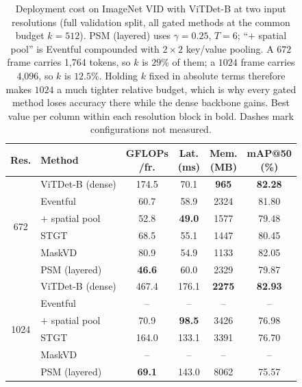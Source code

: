 \begin{table}[t]
\centering
\footnotesize
\setlength{\tabcolsep}{3pt}
\begin{tabular}{clcccc}
\toprule
Res. & Method & \makecell{GFLOPs\\/fr.} & \makecell{Lat.\\(ms)} & \makecell{Mem.\\(MB)} & \makecell{mAP@50\\(\%)} \\
\midrule
\multirow{6}{*}{672}
 & ViTDet-B (dense)     & 174.5 & 70.1 & \textbf{965}  & \textbf{82.28} \\
 & Eventful             & 60.7  & 58.9 & 2324 & 81.80 \\
 & \;\;$+$ spatial pool & 52.8  & \textbf{49.0} & 1577 & 79.48 \\
 & STGT                 & 68.5  & 55.1 & 1447 & 80.45 \\
 & MaskVD               & 80.9  & 54.9 & 1133 & 82.05 \\
 & PSM (layered)        & \textbf{46.6} & 60.0 & 2329 & 79.87 \\
\midrule
\multirow{6}{*}{1024}
 & ViTDet-B (dense)     & 467.4 & 176.1 & \textbf{2275} & \textbf{82.93} \\
 & Eventful             & --    & --    & --   & --    \\
 & \;\;$+$ spatial pool & 70.9  & \textbf{98.5} & 3426 & 76.98 \\
 & STGT                 & 164.0 & 133.1 & 3391 & 76.70 \\
 & MaskVD               & --    & --    & --   & --    \\
 & PSM (layered)        & \textbf{69.1} & 143.0 & 8062 & 75.57 \\
\bottomrule
\end{tabular}
\caption{Deployment cost on ImageNet VID with ViTDet-B at two input
resolutions (full validation split, all gated methods at the common
budget $k = 512$). PSM (layered) uses $\gamma = 0.25$, $T = 6$;
``$+$ spatial pool'' is Eventful compounded with $2{\times}2$ key/value
pooling. A $672$ frame carries 1{,}764 tokens, so $k$ is $29\%$ of them;
a $1024$ frame carries 4{,}096, so $k$ is $12.5\%$. Holding $k$ fixed in
absolute terms therefore makes $1024$ a much tighter relative budget,
which is why every gated method loses accuracy there while the dense
backbone gains. Best value per column within each resolution block in
bold. Dashes mark configurations not measured.}
\label{tab:vid}
\end{table}

